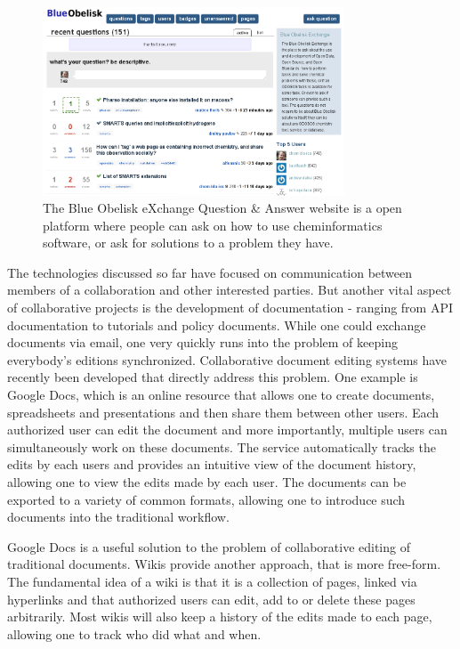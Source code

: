 \documentclass[11pt]{book}
\begin{document}
\begin{figure}[bt]
\begin{center}
\includegraphics[width=0.8\textwidth]{graphics/boShapado.png}
\end{center}
\caption{The Blue Obelisk eXchange Question \& Answer
website is a open platform where people can ask on how
to use cheminformatics software, or ask for solutions
to a problem they have.}
\label{fig:shapado}
\end{figure}

The technologies discussed so far have focused on communication
between members of a collaboration and other interested parties. But
another vital aspect of collaborative projects is the development of
documentation - ranging from API documentation to tutorials and policy
documents. While one could exchange documents via email, one very
quickly runs into the problem of keeping everybody's editions
synchronized. Collaborative document editing systems have recently
been developed that directly address this problem. One example is
Google Docs, which is an online resource that allows one to create
documents, spreadsheets and presentations and then share them between
other users. Each authorized user can edit the document and more
importantly, multiple users can simultaneously work on these
documents. The service automatically tracks the edits by each users and
provides an intuitive view of the document history, allowing one to
view the edits made by each user. The documents can be exported to a
variety of common formats, allowing one to introduce such documents
into the traditional workflow.

Google Docs is a useful solution to the problem of collaborative
editing of traditional documents. Wikis provide another approach, that
is more free-form. The fundamental idea of a wiki is that it is a
collection of pages, linked via hyperlinks and that authorized users
can edit, add to or delete these pages arbitrarily. Most wikis will
also keep a history of the edits made to each page, allowing one to
track who did what and when. 
\end{document}
